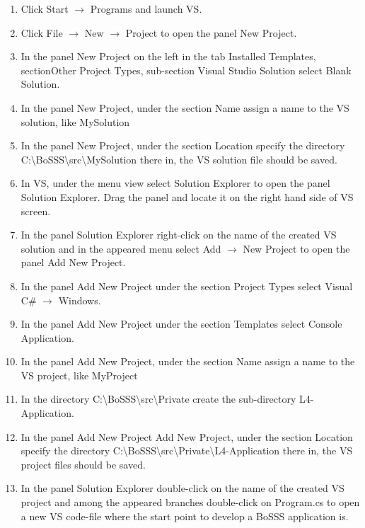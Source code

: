 \documentclass[11pt,twoside,a4paper]{fdyartcl}
\begin{document}
\begin{enumerate}
\item Click {\scriptsize Start $\rightarrow$ Programs} and launch VS.
\item Click {\scriptsize File $\rightarrow$ New $\rightarrow$ Project} to open the panel {\scriptsize New Project}.
\item In the panel {\scriptsize New Project} on the left in the tab {\scriptsize Installed Templates}, section{\scriptsize Other Project Types}, sub-section {\scriptsize Visual Studio Solution} select {\scriptsize Blank Solution}.
\item In the panel {\scriptsize New Project}, under the section {\scriptsize Name} assign a name to the VS solution, like {\scriptsize MySolution}
\item In the panel {\scriptsize New Project}, under the section {\scriptsize Location} specify the directory {\scriptsize C:\textbackslash BoSSS\textbackslash src\textbackslash MySolution} there in, the VS solution file should be saved.
\item In VS, under the menu {\scriptsize view} select {\scriptsize Solution Explorer} to open the panel {\scriptsize Solution Explorer}. Drag the panel and locate it on the right hand side of VS screen.
\item In the panel {\scriptsize Solution Explorer} right-click on the name of the created VS solution and in the appeared menu select {\scriptsize Add $\rightarrow$ New Project} to open the panel {\scriptsize Add New Project}.
\item In the panel {\scriptsize Add New Project} under the section {\scriptsize Project Types} select {\scriptsize Visual C\# $\rightarrow$ Windows}.
\item In the panel {\scriptsize Add New Project} under the section {\scriptsize Templates} select {\scriptsize Console Application}.
\item In the panel {\scriptsize Add New Project}, under the section {\scriptsize Name} assign a name to the VS project, like {\scriptsize MyProject}
\item In the directory {\scriptsize C:\textbackslash BoSSS\textbackslash src\textbackslash Private} create the sub-directory {\scriptsize L4-Application}.
\item In the panel {\scriptsize Add New Project} {\scriptsize Add New Project}, under the section {\scriptsize Location} specify the directory {\scriptsize C:\textbackslash BoSSS\textbackslash src\textbackslash Private\textbackslash L4-Application} there in, the VS project files should be saved.
\item In the panel {\scriptsize Solution Explorer} double-click on the name of the created VS project and among the appeared branches double-click on {\scriptsize Program.cs} to open a new VS code-file where the start point to develop a BoSSS application is.
\end{enumerate}
\end{document}
